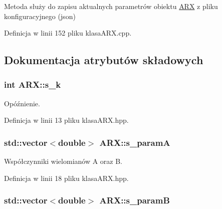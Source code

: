 Metoda służy do zapisu aktualnych parametrów obiektu \hyperlink{class_a_r_x}{A\-R\-X} z pliku konfiguracyjnego (json) 



Definicja w linii 152 pliku klasa\-A\-R\-X.\-cpp.



\subsection{Dokumentacja atrybutów składowych}
\hypertarget{class_a_r_x_a041d4c3b4a858f93cbb6281dbf3ce061}{
\subsubsection[{s\-\_\-k}]{\setlength{\rightskip}{0pt plus 5cm}int A\-R\-X\-::s\-\_\-k\hspace{0.3cm}{\ttfamily [private]}}}\label{class_a_r_x_a041d4c3b4a858f93cbb6281dbf3ce061}


Opóźnienie. 



Definicja w linii 13 pliku klasa\-A\-R\-X.\-hpp.

\hypertarget{class_a_r_x_a6f9a9743a50d912f9e8547a433b2baea}{
\subsubsection[{s\-\_\-param\-A}]{\setlength{\rightskip}{0pt plus 5cm}std\-::vector$<$double$>$ A\-R\-X\-::s\-\_\-param\-A\hspace{0.3cm}{\ttfamily [protected]}}}\label{class_a_r_x_a6f9a9743a50d912f9e8547a433b2baea}


Współczynniki wielomianów A oraz B. 



Definicja w linii 18 pliku klasa\-A\-R\-X.\-hpp.

\hypertarget{class_a_r_x_a57104d29d3cdd002f814d3460a9be2df}{
\subsubsection[{s\-\_\-param\-B}]{\setlength{\rightskip}{0pt plus 5cm}std\-::vector$<$double$>$ A\-R\-X\-::s\-\_\-param\-B\hspace{0.3cm}{\ttfamily [protected]}}}\label{class_a_r_x_a57104d29d3cdd002f814d3460a9be2df}


